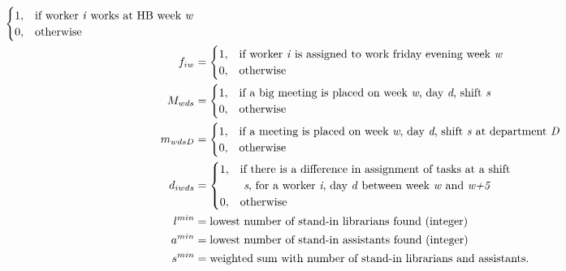 \begin{align}
\begin{cases}
 		1, & \text{if worker \textit{i} works at HB week \textit{w}} \\
 		0, & \text{otherwise}
	\end{cases}
	\\
	f_{iw}&=
	\begin{cases}
 		1, & \text{if worker \textit{i} is assigned to work friday evening week \textit{w}} \\
 		0, & \text{otherwise}
	\end{cases}	
	\\
	M_{wds}&=
	\begin{cases}
	 	1, & \text{if a big meeting is placed on week \textit{w}, day \textit{d}, shift \textit{s}} \\
	 	0, & \text{otherwise}
	\end{cases}
	\\
	m_{wdsD}&=
	\begin{cases}
	 	1, & \text{if a meeting is placed on week \textit{w}, day \textit{d}, shift \textit{s} at department \textit{D}} \\
	 	0, & \text{otherwise}
	\end{cases}
	\\
	d_{iwds}&=
	\begin{cases}
	 	1, & \text{if there is a difference in assignment of tasks at a shift}\\
	 		& \text{ \textit{s}, for a worker \textit{i}, day \textit{d} between week \textit{w} and \textit{w+5}} \\
	 	0, & \text{otherwise}
	\end{cases}
	\\
	l^{min}&= \text{lowest number of stand-in librarians found (integer)} \\
	a^{min}&= \text{lowest number of stand-in assistants found (integer)} \\
	s^{min}&= \text{weighted sum with number of stand-in librarians and assistants}.
\end{align}




